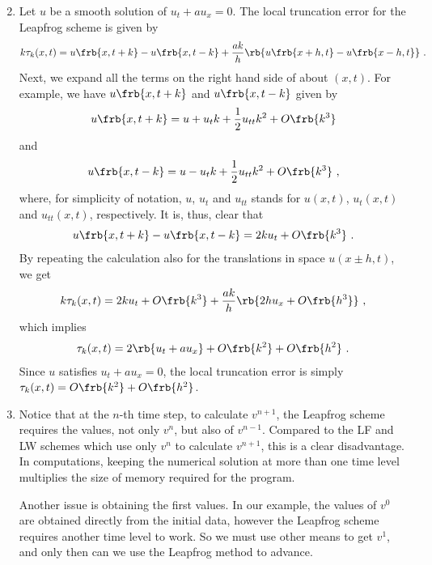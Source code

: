 \documentclass{article}
\begin{document}
\begin{exerciseList}
\item
\begin{enumerate}\setcounter{enumii}{1}
\item
Let $u$ be a smooth solution of $u_t+au_x=0$. The local truncation error for the Leapfrog scheme is given by 
\begin{gather} \label{LeapfTrunc}
	k\tau_k(x,t)=u\frb{x,t+k}-u\frb{x,t-k}+\frac{ak}{h}\rb{u\frb{x+h,t}-u\frb{x-h,t}}\ . 
\end{gather}
Next, we expand all the terms on the right hand side of  about $(x,t)$. For example, we have $u\frb{x,t+k}$ and $u\frb{x,t-k}$ given by 
\begin{gather}
	u\frb{x,t+k}=u +u_tk +\frac{1}{2}u_{tt}k^2+O\frb{k^3} 
\end{gather}
and
\begin{gather}
	u\frb{x,t-k}=u -u_tk +\frac{1}{2}u_{tt}k^2+O\frb{k^3}\ , 
\end{gather}
where, for simplicity of notation, $u$, $u_t$ and $u_{tt}$ stands for $u(x,t)$, $u_t(x,t)$ and $u_{tt}(x,t)$, respectively. It is, thus, clear that 
\begin{gather}
	u\frb{x,t+k}-u\frb{x,t-k}=2ku_t+O\frb{k^3}\ .
\end{gather}
By repeating the calculation also for the translations in space $u(x\pm h,t)$, we get 
\begin{gather}
	k\tau_k(x,t)=2ku_t+O\frb{k^3} +\frac{ak}{h}\rb{2hu_x+O\frb{h^3}}\ , 
\end{gather}
which implies 
\begin{gather}
	\tau_k(x,t)=2\rb{u_t+au_x}+O\frb{k^2}+O\frb{h^2}\ . 
\end{gather}
Since $u$ satisfies $u_t+au_x=0$, the local truncation error is simply $\tau_k(x,t)=O\frb{k^2}+O\frb{h^2}$. 

\item
Notice that at the $n$-th time step, to calculate $v^{n+1}$, the Leapfrog scheme requires the values, not only $v^n$, but also of $v^{n-1}$.
Compared to the LF and LW schemes which use only $v^n$ to calculate $v^{n+1}$, this is a clear disadvantage. In computations, keeping the numerical solution at more than one time level multiplies the size of memory required for the program.

Another issue is obtaining the first values. In our example, the values of $v^0$ are obtained directly from the initial data, however the Leapfrog scheme requires another time level to work.
So we must use other means to get $v^1$, and only then can we use the Leapfrog method to advance.
\end{enumerate}







\end{exerciseList}
\end{document}
